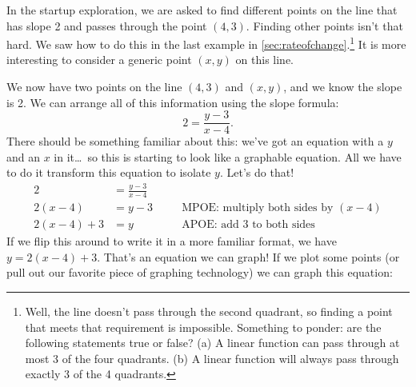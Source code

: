%
%
%
%
%
%
%
%
%

In the startup exploration, we are asked to find different points on the line that has slope 2 and passes through the point $(4,3)$. Finding other points isn't that hard. We saw how to do this in the last example in \cref{sec:rateofchange}.\footnote{Well, the line doesn't pass through the second quadrant, so finding a point that meets that requirement is impossible. Something to ponder: are the following statements true or false? (a) A linear function can pass through at most 3 of the four quadrants. (b) A linear function will always pass through exactly 3 of the 4 quadrants.} It is more interesting to consider a generic point $(x,y)$ on this line.

We now have two points on the line $(4,3)$ and $(x,y)$, and we know the slope is 2. We can arrange all of this information using the slope formula: \[2 = \frac{y-3}{x-4}.\] There should be something familiar about this: we've got an equation with a $y$ and an $x$ in it\ldots\ so this is starting to look like a graphable equation. All we have to do it transform this equation to isolate $y$. Let's do that!
\[\begin{aligned}
2 &= \frac{y-3}{x-4}
\\
2(x-4) &= y-3
&& \quad\text{MPOE: multiply both sides by $(x-4)$}
\\
2(x-4)+3 &= y
&& \quad\text{APOE: add 3 to both sides}
\end{aligned}\]
If we flip this around to write it in a more familiar format, we have $y=2(x-4)+3$. That's an equation we can graph! If we plot some points (or pull out our favorite piece of graphing technology) we can graph this equation:

